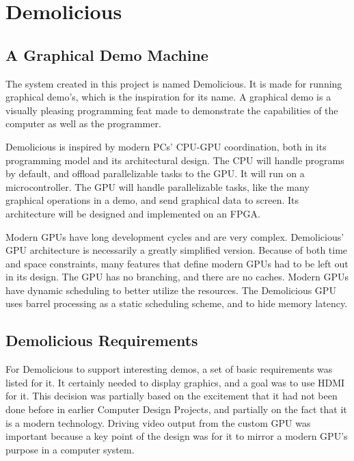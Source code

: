 \documentclass[../main/report.tex]{subfiles}
\begin{document}
\chapter{Demolicious}
\label{sec:demolicious}



\section{A Graphical Demo Machine}
\label{sec:demolicious-demo-machine}

The system created in this project is named Demolicious.
It is made for running graphical demo's, which is the inspiration for its name.
A graphical demo is a visually pleasing programming feat made to demonstrate the capabilities of the computer as well as the programmer.

Demolicious is inspired by modern PCs' CPU-GPU coordination, both in its programming model and its architectural design.
The CPU will handle programs by default, and offload parallelizable tasks to the GPU.
It will run on a microcontroller.
The GPU will handle parallelizable tasks, like the many graphical operations in a demo, and send graphical data to screen.
Its architecture will be designed and implemented on an FPGA.

Modern GPUs have long development cycles and are very complex.
Demolicious' GPU architecture is necessarily a greatly simplified version.
Because of both time and space constraints, many features that define modern GPUs had to be left out in its design.
The GPU has no branching, and there are no caches.
Modern GPUs have dynamic scheduling to better utilize the resources.
The Demolicious GPU uses barrel processing as a static scheduling scheme, and to hide memory latency.

\section{Demolicious Requirements}

For Demolicious to support interesting demos, a set of basic requirements was listed for it.
It certainly needed to display graphics, and a goal was to use HDMI for it.
This decision was partially based on the excitement that it had not been done before in earlier Computer Design Projects, and partially on the fact that it is a modern technology.
Driving video output from the custom GPU was important because a key point of the design was for it to mirror a modern GPU's purpose in a computer system.
\end{document}
